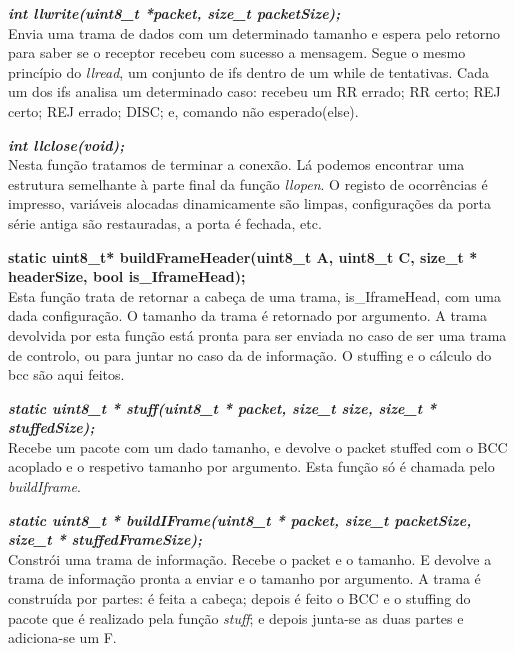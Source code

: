 \documentclass[a4paper]{article}
\begin{document}
\noindent\textbf{\textit{int llwrite(uint8\_t *packet, size\_t packetSize);}}\\
Envia uma trama de dados com um determinado tamanho e espera pelo retorno para
saber se o receptor recebeu com sucesso a mensagem. Segue o mesmo
princípio do \textit{llread}, um conjunto de ifs dentro de um while de
tentativas. Cada um dos ifs analisa um determinado caso: recebeu um RR errado;
RR certo; REJ certo; REJ errado; DISC; e, comando não esperado(else).\linebreak

\noindent\textbf{\textit{int llclose(void);}}\\
Nesta função tratamos de terminar a conexão. Lá podemos encontrar uma estrutura
semelhante à parte final da função \textit{llopen}. O registo de ocorrências é
impresso, variáveis alocadas dinamicamente são limpas, configurações da porta
série antiga são restauradas, a porta é fechada, etc.\linebreak

\noindent\textbf{static uint8\_t* buildFrameHeader(uint8\_t A, uint8\_t C,
size\_t * headerSize, bool is\_IframeHead);}\\
Esta função trata de retornar a cabeça de uma trama,
is\_IframeHead, com uma dada configuração. O tamanho da trama é retornado por
argumento. A trama devolvida por esta função está pronta para ser enviada no caso de
ser uma trama de controlo, ou para juntar no caso da de informação. O
stuffing e o cálculo do bcc são aqui feitos.\linebreak

\noindent\textbf{\textit{static uint8\_t * stuff(uint8\_t * packet, size\_t size,
size\_t * stuffedSize);}}\\
Recebe um pacote com um dado tamanho, e devolve o packet stuffed com o BCC
acoplado e o respetivo tamanho por argumento. Esta função só é chamada pelo
\textit{buildIframe}.
\linebreak

\noindent\textbf{\textit{static uint8\_t * buildIFrame(uint8\_t * packet, size\_t
packetSize, size\_t * stuffedFrameSize);}}\\
Constrói uma trama de informação. Recebe o packet e o tamanho. E devolve a
trama de informação pronta a enviar e o tamanho por argumento. A trama é
construída por partes: é feita a cabeça; depois é feito o BCC e o stuffing do
pacote que é realizado pela função \textit{stuff}; e depois junta-se as
duas partes e adiciona-se um F.\linebreak
\end{document}
